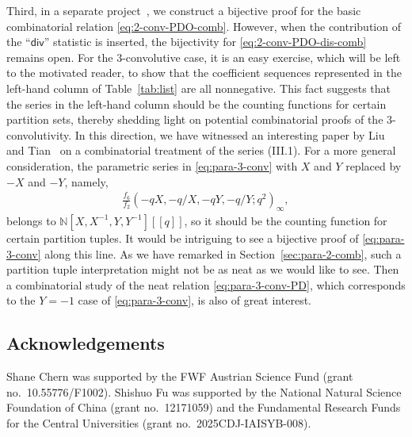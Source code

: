 \documentclass[12pt,reqno]{amsart}
\numberwithin{equation}{section}
\theoremstyle{plain}
\theoremstyle{definition}
\theoremstyle{named}
\newcommand{\dis}{\mathsf{div}}
\begin{document}
Third, in a separate project~\cite{CEFS3}, we construct a bijective proof for the basic combinatorial relation \eqref{eq:2-conv-PDO-comb}. However, when the contribution of the ``$\dis$'' statistic is inserted, the bijectivity for \eqref{eq:2-conv-PDO-dis-comb} remains open. For the $3$-convolutive case, it is an easy exercise, which will be left to the motivated reader, to show that the coefficient sequences represented in the left-hand column of Table~\ref{tab:list} are all nonnegative. This fact suggests that the series in the left-hand column should be the counting functions for certain partition sets, thereby shedding light on potential combinatorial proofs of the $3$-convolutivity. In this direction, we have witnessed an interesting paper by Liu and Tian~\cite{LiuTian} on a combinatorial treatment of the series (III.1). For a more general consideration, the parametric series in \eqref{eq:para-3-conv} with $X$ and $Y$ replaced by $-X$ and $-Y$, namely,
\begin{align*}
	\frac{f_6}{f_2} (-qX,-q/X,-qY,-q/Y;q^2)_\infty,
\end{align*}
belongs to $\mathbb{N}[X,X^{-1},Y,Y^{-1}][[q]]$, so it should be the counting function for certain partition tuples. It would be intriguing to see a bijective proof of \eqref{eq:para-3-conv} along this line. As we have remarked in Section~\ref{sec:para-2-comb}, such a partition tuple interpretation might not be as neat as we would like to see. Then a combinatorial study of the neat relation \eqref{eq:para-3-conv-PD}, which corresponds to the $Y=-1$ case of \eqref{eq:para-3-conv}, is also of great interest.

\subsection*{Acknowledgements}

Shane Chern was supported by the FWF Austrian Science Fund (grant no.~10.55776/F1002). Shishuo Fu was supported by the National Natural Science Foundation of China (grant no.~12171059) and the Fundamental Research Funds for the Central Universities (grant no.~2025CDJ-IAISYB-008). 
\end{document}
